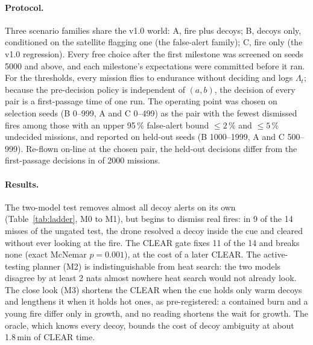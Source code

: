 \documentclass[10pt,a4paper]{article}
\begin{document}
\paragraph{Protocol.} Three scenario families share the v1.0 world: A, fire plus decoys; B, decoys only, conditioned on the satellite flagging one (the false-alert family); C, fire only (the v1.0 regression). Every free choice after the first milestone was screened on seeds 5000 and above, and each milestone's expectations were committed before it ran. For the thresholds, every mission flies to endurance without deciding and logs $\Lambda_t$; because the pre-decision policy is independent of $(a,b)$, the decision of every pair is a first-passage time of one run. The operating point was chosen on selection seeds (B 0--999, A and C 0--499) as the pair with the fewest dismissed fires among those with an upper 95\,\% false-alert bound $\le 2\,\%$ and $\le 5\,\%$ undecided missions, and reported on held-out seeds (B 1000--1999, A and C 500--999). Re-flown on-line at the chosen pair, the held-out decisions differ from the first-passage decisions in \opmismatch{} of 2000 missions.

\begin{table}[h]
\centering\small
\caption{The ablation ladder at the a-priori thresholds $a=-b=\log 99$, selection seeds (B: 1000, A and C: 500 each). Times are medians in minutes.}
\label{tab:ladder}
\end{table}

\paragraph{Results.} The two-model test removes almost all decoy alerts on its own (Table~\ref{tab:ladder}, M0 to M1), but begins to dismiss real fires: in 9 of the 14 misses of the ungated test, the drone resolved a decoy inside the cue and cleared without ever looking at the fire. The CLEAR gate fixes 11 of the 14 and breaks none (exact McNemar $p=0.001$), at the cost of a later CLEAR. The active-testing planner (M2) is indistinguishable from heat search: the two models disagree by at least 2 nats almost nowhere heat search would not already look. The close look (M3) shortens the CLEAR when the cue holds only warm decoys and lengthens it when it holds hot ones, as pre-registered: a contained burn and a young fire differ only in growth, and no reading shortens the wait for growth. The oracle, which knows every decoy, bounds the cost of decoy ambiguity at about 1.8\,min of CLEAR time.
\end{document}
